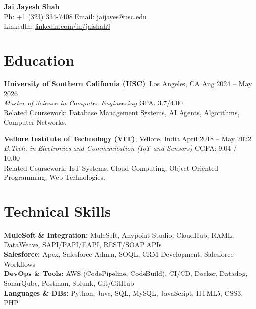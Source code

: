 \documentclass[letterpaper,10pt]{article}
\begin{document}
\begin{center}
    {\LARGE \textbf{Jai Jayesh Shah}} \\
    \vspace{5pt}
    \small
    Ph: +1 (323) 334-7408 \quad Email: \href{mailto:jaijayes@usc.edu}{jaijayes@usc.edu} \\
    LinkedIn: \href{https://www.linkedin.com/in/jaishah9}{linkedin.com/in/jaishah9} \\
    \vspace{-8pt}
\end{center}

\section*{Education}
\textbf{University of Southern California (USC)}, Los Angeles, CA \hfill Aug 2024 -- May 2026 \\
\textit{Master of Science in Computer Engineering} \hfill GPA: 3.7/4.00 \\
Related Coursework: Database Management Systems, AI Agents, Algorithms, Computer Networks.

\vspace{2pt}

\textbf{Vellore Institute of Technology (VIT)}, Vellore, India \hfill April 2018 -- May 2022 \\
\textit{B.Tech. in Electronics and Communication (IoT and Sensors)} \hfill CGPA: 9.04 / 10.00 \\
Related Coursework: IoT Systems, Cloud Computing, Object Oriented Programming, Web Technologies.

\section*{Technical Skills}
\textbf{MuleSoft \& Integration:} MuleSoft, Anypoint Studio, CloudHub, RAML, DataWeave, SAPI/PAPI/EAPI, REST/SOAP APIs \\
\textbf{Salesforce:} Apex, Salesforce Admin, SOQL, CRM Development, Salesforce Workflows \\
\textbf{DevOps \& Tools:} AWS (CodePipeline, CodeBuild), CI/CD, Docker, Datadog, SonarQube, Postman, Splunk, Git/GitHub \\
\textbf{Languages \& DBs:} Python, Java, SQL, MySQL, JavaScript, HTML5, CSS3, PHP

\end{document}
